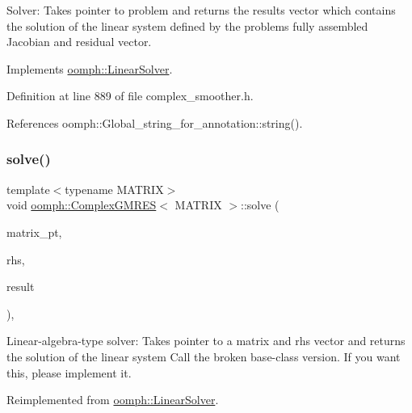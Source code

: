 Solver\+: Takes pointer to problem and returns the results vector which contains the solution of the linear system defined by the problem\textquotesingle{}s fully assembled Jacobian and residual vector. 



Implements \hyperlink{classoomph_1_1LinearSolver_a15ce22542b74ed1826ea485edacbeb6e}{oomph\+::\+Linear\+Solver}.



Definition at line 889 of file complex\+\_\+smoother.\+h.



References oomph\+::\+Global\+\_\+string\+\_\+for\+\_\+annotation\+::string().

\mbox{\label{classoomph_1_1ComplexGMRES_a9dd1695e8d907d57151df79a6e3e3968}} 
\subsubsection{\texorpdfstring{solve()}{solve()}\hspace{0.1cm}{\footnotesize\ttfamily [2/2]}}
{\footnotesize\ttfamily template$<$typename M\+A\+T\+R\+IX$>$ \\
void \hyperlink{classoomph_1_1ComplexGMRES}{oomph\+::\+Complex\+G\+M\+R\+ES}$<$ M\+A\+T\+R\+IX $>$\+::solve (\begin{DoxyParamCaption}\item[{\hyperlink{classoomph_1_1DoubleMatrixBase}{Double\+Matrix\+Base} $\ast$const \&}]{matrix\+\_\+pt,  }\item[{const \hyperlink{classoomph_1_1Vector}{Vector}$<$ double $>$ \&}]{rhs,  }\item[{\hyperlink{classoomph_1_1Vector}{Vector}$<$ double $>$ \&}]{result }\end{DoxyParamCaption})\hspace{0.3cm}{\ttfamily [inline]}, {\ttfamily [virtual]}}



Linear-\/algebra-\/type solver\+: Takes pointer to a matrix and rhs vector and returns the solution of the linear system Call the broken base-\/class version. If you want this, please implement it. 



Reimplemented from \hyperlink{classoomph_1_1LinearSolver_a1f7a2ee2cd18d3dafc20a61ca2f52dbb}{oomph\+::\+Linear\+Solver}.



